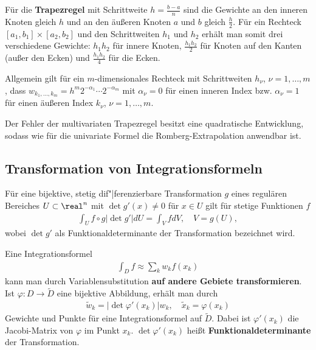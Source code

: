 \linie

Für die \textbf{Trapezregel} mit Schrittweite $h = \frac{b - a}{n}$
sind die Gewichte an den inneren Knoten gleich $h$ und an den äußeren
Knoten $a$ und $b$ gleich $\frac{h}{2}$.
Für ein Rechteck $[a_1, b_1] \times [a_2, b_2]$ und den Schrittweiten $h_1$
und $h_2$ erhält man somit drei verschiedene Gewichte:
$h_1 h_2$ für innere Knoten, $\frac{h_1 h_2}{2}$ für Knoten auf den Kanten
(außer den Ecken) und $\frac{h_1 h_2}{4}$ für die Ecken.

Allgemein gilt für ein $m$-dimensionales Rechteck mit Schrittweiten
$h_\nu$, $\nu = 1, \dotsc, m$, dass
$w_{k_1, \dotsc, k_m} = h^m 2^{-\alpha_1} \dotsm 2^{-\alpha_m}$
mit $\alpha_\nu = 0$ für einen inneren Index bzw.
$\alpha_\nu = 1$ für einen äußeren Index $k_\nu$, $\nu = 1, \dotsc, m$.

Der Fehler der multivariaten Trapezregel besitzt eine quadratische Entwicklung,
sodass wie für die univariate Formel die Romberg-Extrapolation anwendbar ist.

\pagebreak

\subsection{%
    Transformation von Integrationsformeln%
}

Für eine bijektive, stetig dif"|ferenzierbare Transformation $g$ eines
regulären Bereiches $U \subset \real^n$ mit
$\det g'(x) \not= 0$ für $x \in U$
gilt für stetige Funktionen $f$
\begin{align*}
    \int_U f \circ g |\det g'| dU = \int_V f dV, \quad V = g(U),
\end{align*}
wobei $\det g'$ als Funktionaldeterminante der Transformation bezeichnet wird.

\linie

Eine Integrationsformel
\begin{align*}
    \int_D f \approx \sum_k w_k f(x_k)
\end{align*}
kann man durch Variablensubstitution
\textbf{auf andere Gebiete transformieren}. \\
Ist $\varphi\colon D \rightarrow \widetilde{D}$ eine bijektive Abbildung,
erhält man durch
\begin{align*}
    \widetilde{w}_k = \left|\det \varphi'(x_k)\right| w_k, \quad
    \widetilde{x}_k = \varphi(x_k)
\end{align*}
Gewichte und Punkte für eine Integrationsformel auf $\widetilde{D}$.
Dabei ist $\varphi'(x_k)$ die Jacobi-Matrix von $\varphi$ im Punkt $x_k$.
$\det \varphi'(x_k)$ heißt \textbf{Funktionaldeterminante} der Transformation.

